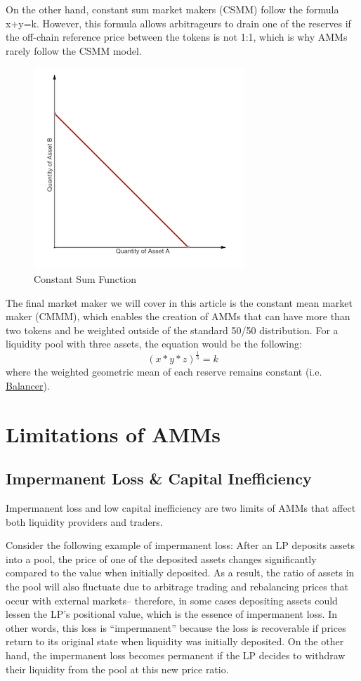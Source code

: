 \documentclass[12pt]{article}
\begin{document}
On the other hand, constant sum market makers (CSMM) follow the formula x+y=k. However, this formula allows arbitrageurs to drain one of the reserves if the off-chain reference price between the tokens is not 1:1, which is why AMMs rarely follow the CSMM model. 
\begin{figure}[H]
    \centering
    \includegraphics[width=0.5\linewidth]{constant_sum.png}
    \caption{Constant Sum Function}
    \label{fig:constant_sum}
\end{figure}

The final market maker we will cover in this article is the constant mean market maker (CMMM), which enables the creation of AMMs that can have more than two tokens and be weighted outside of the standard 50/50 distribution. For a liquidity pool with three assets, the equation would be the following:
\[
(x*y*z)^{\frac{1}{3}}=k
\]
where the weighted geometric mean of each reserve remains constant (i.e. \href{https://balancer.fi/}{Balancer}).

\section{Limitations of AMMs}
\subsection{Impermanent Loss \& Capital Inefficiency}
Impermanent loss and low capital inefficiency are two limits of AMMs that affect both liquidity providers and traders.

Consider the following example of impermanent loss: After an LP deposits assets into a pool, the price of one of the deposited assets changes significantly compared to the value when initially deposited. As a result, the ratio of assets in the pool will also fluctuate due to arbitrage trading and rebalancing prices that occur with external markets– therefore, in some cases depositing assets could lessen the LP’s positional value, which is the essence of impermanent loss. In other words, this loss is “impermanent” because the loss is recoverable if prices return to its original state when liquidity was initially deposited. On the other hand, the impermanent loss becomes permanent if the LP decides to withdraw their liquidity from the pool at this new price ratio.
\end{document}

